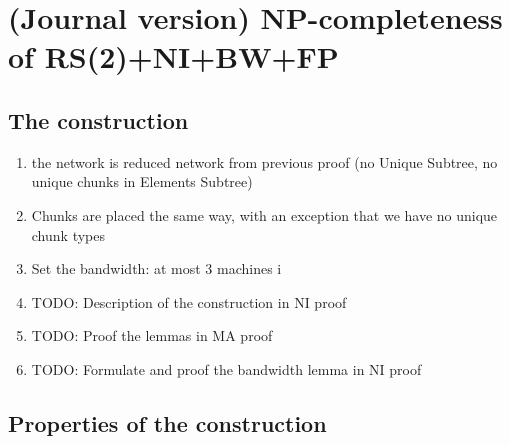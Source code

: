 \section{(Journal version) NP-completeness of RS(2)+NI+BW+FP}

\subsection{The construction}

\begin{enumerate}
\item the network is reduced network from previous proof (no Unique Subtree, no unique chunks in Elements Subtree)
\item Chunks are placed the same way, with an exception that we have no unique chunk types
\item Set the bandwidth: at most 3 machines i
\item TODO: Description of the construction in NI proof
\item TODO: Proof the lemmas in MA proof
\item TODO: Formulate and proof the bandwidth lemma in NI proof
\end{enumerate}

\subsection{Properties of the construction}